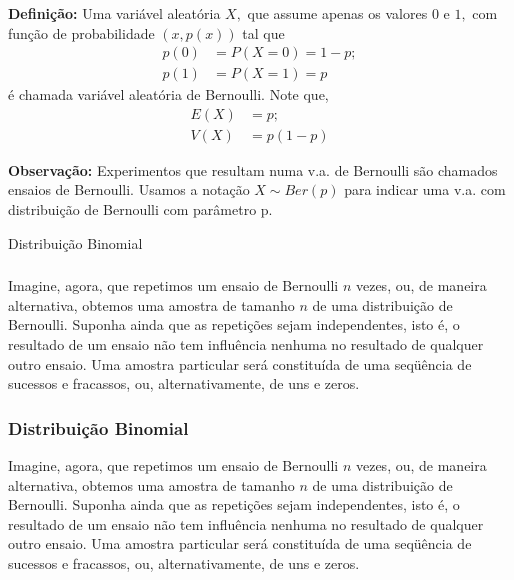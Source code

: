 \documentclass[14pt,aspectratio=1610]{beamer}
\begin{document}
\begin{frame}{}
\frametitle{}
\begin{block}{}
\justifying
{\bf Definição:} Uma variável aleatória $X,$ que assume apenas os valores $0$ e $1,$ com função de probabilidade $(x, p(x))$ tal que
\begin{align*}
p(0)&=P(X=0)=1-p;\\
p(1)&=P(X=1)=p
\end{align*}
é chamada variável aleatória de Bernoulli. Note que,
\begin{align*}
E(X)&=p;\\
V(X)&=p(1-p)
\end{align*}
\end{block}
\pause
\begin{block}{}
{\bf Observação:} Experimentos que resultam numa v.a. de Bernoulli são chamados ensaios
de Bernoulli. Usamos a notação $X\sim Ber(p)$ para indicar uma v.a. com distribuição de Bernoulli com parâmetro p. 
\end{block}
\end{frame}

\begin{frame}{Distribuição Binomial}
\frametitle{}
\begin{block}{}
\justifying
Imagine, agora, que repetimos um ensaio de Bernoulli $n$ vezes, ou, de maneira
alternativa, obtemos uma amostra de tamanho $n$ de uma distribuição de Bernoulli.
Suponha ainda que as repetições sejam independentes, isto é, o resultado de um ensaio
não tem influência nenhuma no resultado de qualquer outro ensaio. Uma amostra
particular será constituída de uma seqüência de sucessos e fracassos, ou, alternativamente, de uns e zeros.
\end{block}
\end{frame}

\begin{frame}{}
\frametitle{Distribuição Binomial}
\begin{block}{}
\justifying
Imagine, agora, que repetimos um ensaio de Bernoulli $n$ vezes, ou, de maneira
alternativa, obtemos uma amostra de tamanho $n$ de uma distribuição de Bernoulli.
Suponha ainda que as repetições sejam independentes, isto é, o resultado de um ensaio
não tem influência nenhuma no resultado de qualquer outro ensaio. Uma amostra
particular será constituída de uma seqüência de sucessos e fracassos, ou, alternativamente, de uns e zeros.
\end{block}
\end{frame}
\end{document}
